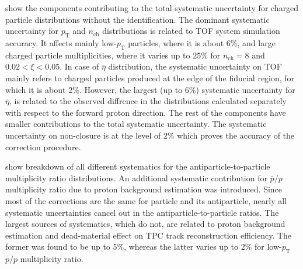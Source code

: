  show the components contributing to the total systematic uncertainty for charged particle distributions without the identification. The dominant systematic uncertainty for $p_\textrm{T}$ and $n_\textrm{ch}$ distributions is related to TOF system simulation accuracy. It affects mainly low-$p_\textrm{T}$ particles, where it is about $6\%$, and large charged particle multiplicities, where it varies up to $25\%$ for $n_\textrm{ch}=8$ and $0.02 < \xi < 0.05$. In case of $\bar{\eta}$ distribution, the systematic uncertainty on TOF mainly refers to charged particles produced at the edge of the fiducial region, for which it is about $2\%$.  However, the largest (up to $6\%$) systematic uncertainty for $\bar{\eta}$,  is related to the observed diffrence  in the distributions calculated separately with respect to the forward proton direction. The rest of the components have smaller contributions to the total systematic uncertainty. The systematic uncertainty on non-closure is at the level of $2\%$ which proves  the accuracy of the correction procedure. 



 show breakdown of all different systematics for the antiparticle-to-particle multiplicity ratio distributions. An additional systematic contribution for $\bar{p}/p$ multiplicity ratio due to proton background estimation was introduced.
Since most of the corrections are the same for particle and its antiparticle, nearly all systematic uncertainties cancel out in the antiparticle-to-particle ratios. 
The largest sources of systematics, which  do not, are related to proton background estimation and dead-material effect on TPC track reconstruction efficiency.  The former was found to be up to $5\%$, whereas the latter varies up to $2\%$ for low-$p_\textrm{T}$ $\bar{p}/p$ multiplicity ratio. 

